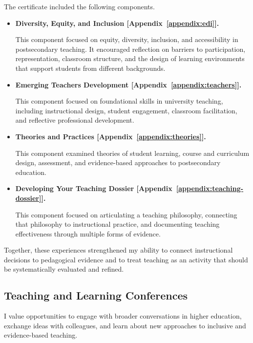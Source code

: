 \documentclass[11pt]{article}
\begin{document}
The certificate included the following components.

\begin{itemize}

\item
\textbf{Diversity, Equity, and Inclusion
[Appendix~\ref{appendix:edi}].}

This component focused on equity,
diversity,
inclusion,
and accessibility in postsecondary teaching.
It encouraged reflection on barriers to participation,
representation,
classroom structure,
and the design of learning environments that support students
from different backgrounds.

\item
\textbf{Emerging Teachers Development
[Appendix~\ref{appendix:teachers}].}

This component focused on foundational skills in university
teaching,
including instructional design,
student engagement,
classroom facilitation,
and reflective professional development.

\item
\textbf{Theories and Practices
[Appendix~\ref{appendix:theories}].}

This component examined theories of student learning,
course and curriculum design,
assessment,
and evidence-based approaches to postsecondary education.

\item
\textbf{Developing Your Teaching Dossier
[Appendix~\ref{appendix:teaching-dossier}].}

This component focused on articulating a teaching philosophy,
connecting that philosophy to instructional practice,
and documenting teaching effectiveness through multiple forms
of evidence.

\end{itemize}

Together,
these experiences strengthened my ability to connect
instructional decisions to pedagogical evidence and to treat
teaching as an activity that should be systematically
evaluated and refined.


\subsection{Teaching and Learning Conferences}

I value opportunities to engage with broader conversations in
higher education,
exchange ideas with colleagues,
and learn about new approaches to inclusive and
evidence-based teaching.
\end{document}
